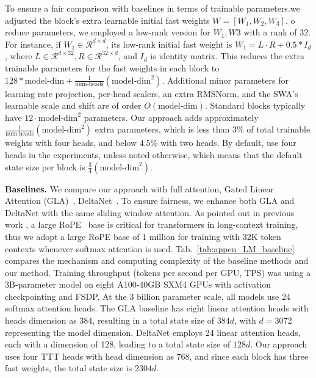 To ensure a fair comparison with baselines in terms of trainable parameters.we adjusted the \methodname{} block's extra learnable initial fast weights $W = [W_1, W_2, W_3]$. o reduce parameters, we employed a low-rank version for $W_1, W3$ with a rank of 32. For instance, if $W_1 \in \mathcal{R}^{d\times d}$, its low-rank initial fast weight is $W_1 = L \cdot R + 0.5 * I_d$, where $L \in \mathcal{R}^{d\times32}, R \in \mathcal{R}^{32\times d}$, and $I_d$ is identity matrix. This reduces the extra trainable parameters for the fast weights in each block to $128 * \text{model-dim} + \frac{1}{\text{num-heads}} (\text{model-dim}^2) $. Additional minor parameters for learning rate projection, per-head scalers, an extra RMSNorm, and the SWA's learnable scale and shift are of order $O(\text{model-dim})$.  Standard blocks typically have $12 \cdot \text{model-dim}^2$ parameters. Our approach adds approximately $\frac{1}{\text{num-heads}} (\text{model-dim}^2)$ extra parameters, which is less than 3\% of total trainable weights with four heads, and below 4.5\% with two heads.  By default, \methodname{} use four heads in the experiments, unless noted otherwise, which means that the default state size per block is $\frac{3}{4} (\text{model-dim}^2)$. 


\noindent\textbf{Baselines.}
We compare our approach with full attention, Gated Linear Attention (GLA)~\cite{yang2024gated}, DeltaNet~\cite{schlag2021linear,yangparallelizing}. To ensure fairness, we enhance both GLA and DeltaNet with the same sliding window attention.  As pointed out in previous work \cite{linforgetting, xiong2023effective, men2024base}, a large RoPE~\cite{su2023roformer} base is critical for transformers in long-context training, thus we adopt a large RoPE base of 1 million for training with 32K token contexts whenever softmax attention is used.
Tab.~\ref{tab:appen_LM_baseline} compares the mechanism and computing complexity of the baseline methods and our method. Training throughput (tokens per second per GPU, TPS) was using a 3B-parameter model on eight A100-40GB SXM4 GPUs with activation checkpointing and FSDP. At the 3 billion parameter scale, all models use 24 softmax attention heads.  The GLA baseline has eight linear attention heads with heads dimension as 384, resulting in a total state size of $384d$, with $d=3072$ representing the model dimension.  DeltaNet employs 24 linear attention heads, each with a dimension of 128, leading to a total state size of $128d$. Our approach uses four TTT heads with head dimension as $768$, and since each block has three fast weights, the total state size is $2304d$. 



